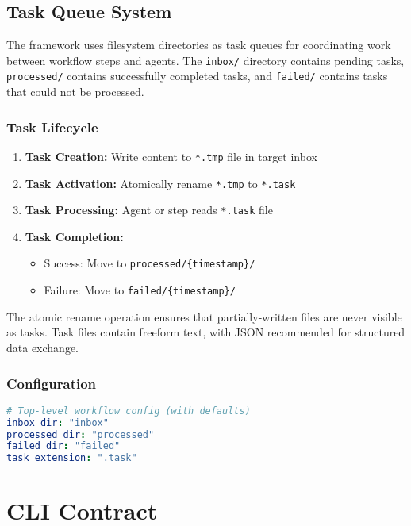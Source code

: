 \documentclass[11pt,a4paper]{article}
\begin{document}
\subsection{Task Queue System}

The framework uses filesystem directories as task queues for coordinating work between workflow steps and agents. The \texttt{inbox/} directory contains pending tasks, \texttt{processed/} contains successfully completed tasks, and \texttt{failed/} contains tasks that could not be processed.

\subsubsection{Task Lifecycle}
\begin{enumerate}
    \item \textbf{Task Creation:} Write content to \texttt{*.tmp} file in target inbox
    \item \textbf{Task Activation:} Atomically rename \texttt{*.tmp} to \texttt{*.task}
    \item \textbf{Task Processing:} Agent or step reads \texttt{*.task} file
    \item \textbf{Task Completion:}
    \begin{itemize}
        \item Success: Move to \texttt{processed/\{timestamp\}/}
        \item Failure: Move to \texttt{failed/\{timestamp\}/}
    \end{itemize}
\end{enumerate}

The atomic rename operation ensures that partially-written files are never visible as tasks. Task files contain freeform text, with JSON recommended for structured data exchange.

\subsubsection{Configuration}

\begin{lstlisting}[language=yaml, caption={Inbox Configuration}]
# Top-level workflow config (with defaults)
inbox_dir: "inbox"
processed_dir: "processed"
failed_dir: "failed"
task_extension: ".task"
\end{lstlisting}

\section{CLI Contract}
\end{document}
